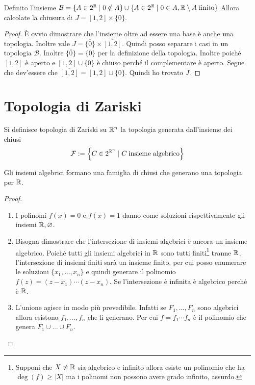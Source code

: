 \begin{theorem}
	Definito l'insieme $\mathcal{B} = \{A \in 2^{\mathbb{R}} \; | \; 0 \notin A \} \cup \{ A \in 2^{\mathbb{R}} \; | \; 0 \in A, \mathbb{R} \setminus A \; \text{finito} \}$ Allora calcolate la chiusura di $J = \left[1,2\right] \times \{0\}$.
\end{theorem}
\begin{proof}
	È ovvio dimostrare che l'insieme oltre ad essere una base è anche una topologia. Inoltre vale $\overline{J} = \overline{\{0\}} \times \overline{\left[1,2\right]}$. Quindi posso separare i casi in un topologia $\mathcal{B}$. Inoltre $\overline{\{0\}} = \{0\}$ per la definizione della topologia. Inoltre poiché $\left[1,2\right]$ è aperto e $\left[1,2\right] \cup \{0\}$ è chiuso perché il complementare è aperto. Segue che dev'essere che $\overline{\left[1,2\right]} = \left[1,2\right] \cup \{0\}$. Quindi ho trovato $\overline{J}$.
\end{proof}


\section{Topologia di Zariski}

\begin{defn}
	Si definisce topologia di Zariski su $\mathbb{R}^n$ la topologia generata dall'insieme dei chiusi 
	\begin{equation}
	\begin{aligned}
	\mathcal{F} := \left\{ C \in 2^{\mathbb{R}^n} \; | \; C \; \text{insieme algebrico} \right\}
	\end{aligned}
	\end{equation}
\end{defn}

\begin{theorem}
	Gli insiemi algebrici formano una famiglia di chiusi che generano una topologia per $\mathbb{R}$.
\end{theorem}
\begin{proof}
	\begin{enumerate}
		\item I polinomi $f(x) = 0$ e $f(x) = 1$ danno come soluzioni rispettivamente gli insiemi $\mathbb{R}, \varnothing$.
		\item Bisogna dimostrare che l'intersezione di insiemi algebrici è ancora un insieme algebrico. Poiché tutti gli insiemi algebrici in $\mathbb{R}$ sono tutti finiti\footnote{Supponi che $X \neq \mathbb{R}$ sia algebrico e infinito allora esiste un polinomio che ha $\deg(f) \ge |X|$ ma i polinomi non possono avere grado infinito, assurdo.} tranne $\mathbb{R}$, l'intersezione di insiemi finiti sarà un insieme finito, per cui posso enumerare le soluzioni $\{x_1, \dots, x_n\}$ e quindi generare il polinomio $f(z) = (z-x_1)\cdots(z-x_n)$. Se l'intersezione è infinita è algebrico perché è $\mathbb{R}$. 
		\item L'unione agisce in modo più prevedibile. Infatti se $F_1, \dots, F_n$ sono algebrici allora esistono $f_1, \dots, f_n$ che li generano. Per cui $f = f_1 \cdots f_n$ è il polinomio che genera $F_1 \cup \dots \cup F_n$.
	\end{enumerate}
\end{proof}

